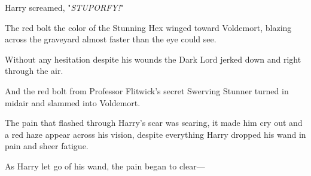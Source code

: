 Harry screamed, "\emph{STUPORFY!}"

The red bolt the color of the Stunning Hex winged toward Voldemort, blazing
across the graveyard almost faster than the eye could see.

Without any hesitation despite his wounds the Dark Lord jerked down and right
through the air.

And the red bolt from Professor Flitwick's secret Swerving Stunner turned in
midair and slammed into Voldemort.

The pain that flashed through Harry's scar was searing, it made him cry out and
a red haze appear across his vision, despite everything Harry dropped his wand
in pain and sheer fatigue.

As Harry let go of his wand, the pain began to clear—
